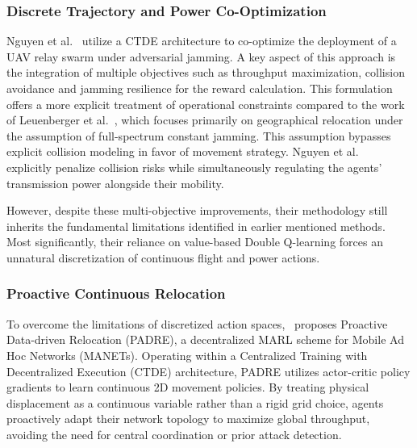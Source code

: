 \documentclass[conference]{IEEEtran}
\newcommand{\adm}[1]{{\color{orange}{[#1]}}}
\begin{document}
\subsubsection{Discrete Trajectory and Power Co-Optimization}
Nguyen et al.~\cite{Nguyen2025_MARL_UAVRelay} utilize a CTDE architecture to co-optimize the deployment of a UAV relay swarm under adversarial jamming.
A key aspect of this approach is the integration of multiple objectives such as throughput maximization, collision avoidance and jamming resilience for the reward calculation.
This formulation offers a more explicit treatment of operational constraints compared to the work of Leuenberger et al.~\cite{11302544}, which focuses primarily on geographical relocation under the assumption of full-spectrum constant jamming.
This assumption bypasses explicit collision modeling in favor of movement strategy.
Nguyen et al.~\cite{Nguyen2025_MARL_UAVRelay} explicitly penalize collision risks while simultaneously regulating the agents' transmission power alongside their mobility.

However, despite these multi-objective improvements, their methodology still inherits the fundamental limitations identified in earlier mentioned methods. 
Most significantly, their reliance on value-based Double Q-learning forces an unnatural discretization of continuous flight and power actions.

\subsubsection{Proactive Continuous Relocation}
To overcome the limitations of discretized action spaces,~\cite{11302544} proposes Proactive Data-driven Relocation (PADRE), a decentralized MARL scheme for Mobile Ad Hoc Networks (MANETs).
Operating within a Centralized Training with Decentralized Execution (CTDE) architecture, PADRE utilizes actor-critic policy gradients to learn continuous 2D movement policies.
By treating physical displacement as a continuous variable rather than a rigid grid choice, agents proactively adapt their network topology to maximize global throughput, avoiding the need for central coordination or prior attack detection.
\end{document}
